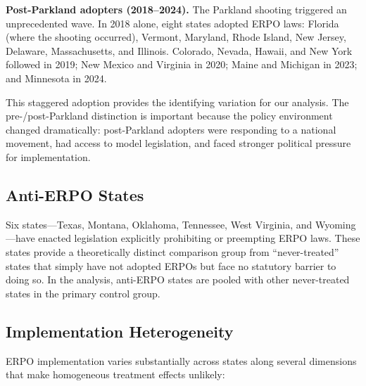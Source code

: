 \documentclass[12pt]{article}
\begin{document}
\textbf{Post-Parkland adopters (2018--2024).} The Parkland shooting triggered an unprecedented wave. In 2018 alone, eight states adopted ERPO laws: Florida (where the shooting occurred), Vermont, Maryland, Rhode Island, New Jersey, Delaware, Massachusetts, and Illinois. Colorado, Nevada, Hawaii, and New York followed in 2019; New Mexico and Virginia in 2020; Maine and Michigan in 2023; and Minnesota in 2024.

This staggered adoption provides the identifying variation for our analysis. The pre-/post-Parkland distinction is important because the policy environment changed dramatically: post-Parkland adopters were responding to a national movement, had access to model legislation, and faced stronger political pressure for implementation.

\subsection{Anti-ERPO States}

Six states---Texas, Montana, Oklahoma, Tennessee, West Virginia, and Wyoming---have enacted legislation explicitly prohibiting or preempting ERPO laws. These states provide a theoretically distinct comparison group from ``never-treated'' states that simply have not adopted ERPOs but face no statutory barrier to doing so. In the analysis, anti-ERPO states are pooled with other never-treated states in the primary control group.

\subsection{Implementation Heterogeneity}

ERPO implementation varies substantially across states along several dimensions that make homogeneous treatment effects unlikely:
\end{document}
